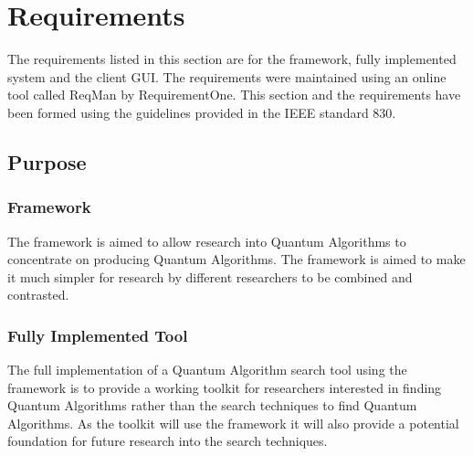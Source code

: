 \documentclass[authoryearcitations]{UoYCSproject}
\begin{document}



\chapter{Requirements}
The requirements listed in this section are for the framework, fully implemented system and the client GUI.
The requirements were maintained using an online tool called ReqMan\cite{reqman} by RequirementOne.
This section and the requirements have been formed using the guidelines provided in the IEEE standard 830\cite{ieee830}.

\section{Purpose}
\subsection{Framework}
The framework is aimed to allow research into Quantum Algorithms to concentrate on producing Quantum Algorithms.
The framework is aimed to make it much simpler for research by different researchers to be combined and contrasted.

\subsection{Fully Implemented Tool}
The full implementation of a Quantum Algorithm search tool using the framework is to provide a working toolkit for researchers interested in finding Quantum Algorithms rather than the search techniques to find Quantum Algorithms.
As the toolkit will use the framework it will also provide a potential foundation for future research into the search techniques.
\end{document}
